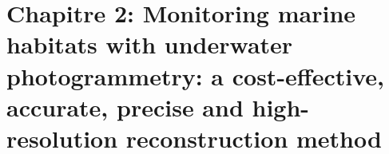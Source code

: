 \renewcommand*{\theHsection}{Acquisition.\the\value{section}}

\chapter[Monitoring marine habitats with underwater photogrammetry: a cost-effective, accurate, precise and high-resolution reconstruction method]{Chapitre 2: Monitoring marine habitats with underwater photogrammetry: a cost-effective, accurate, precise and high-resolution reconstruction method} \label{chapitre2-methode}

\pagestyle{main}

\begin{center}
\end{center}


